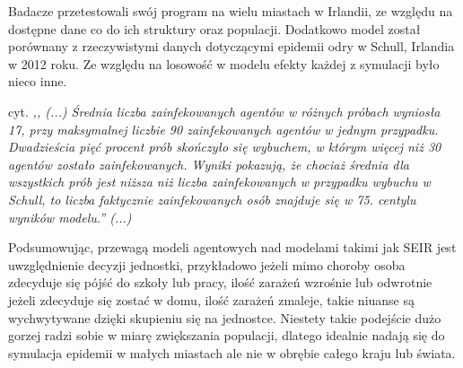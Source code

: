Badacze przetestowali swój program na wielu miastach w Irlandii, ze względu na dostępne dane co do ich struktury oraz populacji.
Dodatkowo model został porównany z rzeczywistymi danych dotyczącymi epidemii odry w Schull, Irlandia w 2012 roku. Ze względu na losowość w modelu efekty każdej z symulacji było nieco inne. 

cyt. \textit{,, (...) Średnia liczba zainfekowanych agentów w różnych próbach wyniosła 17, przy maksymalnej liczbie 90 zainfekowanych agentów w jednym przypadku. Dwadzieścia pięć procent prób skończyło się wybuchem, w którym więcej niż 30 agentów zostało zainfekowanych. Wyniki pokazują, że chociaż średnia dla wszystkich prób jest niższa niż liczba zainfekowanych w przypadku wybuchu w Schull, to liczba faktycznie zainfekowanych osób znajduje się w 75. centylu wyników modelu.'' (...)}\cite{bib:artykul1}

Podsumowując, przewagą modeli agentowych nad modelami takimi jak SEIR jest uwzględnienie decyzji jednostki, przykładowo jeżeli mimo choroby osoba zdecyduje się pójść do szkoły lub pracy, ilość zarażeń wzrośnie lub odwrotnie jeżeli zdecyduje się zostać w domu, ilość zarażeń zmaleje, takie niuanse są wychwytywane dzięki skupieniu się na jednostce. Niestety takie podejście dużo gorzej radzi sobie w miarę zwiększania populacji, dlatego idealnie nadają się do symulacja epidemii w małych miastach ale nie w obrębie całego kraju lub świata.




